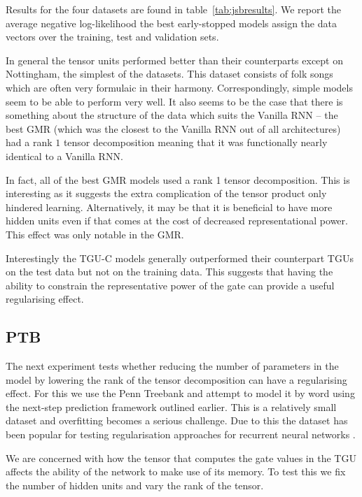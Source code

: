 Results for the four datasets are found in table~\ref{tab:jsbresults}. We report the average
negative log-likelihood the best early-stopped models assign the data vectors over
the training, test and validation sets.

In general the tensor units performed better than their counterparts except on
Nottingham, the simplest of the datasets. This dataset consists of folk songs which
are often very formulaic in their harmony. Correspondingly, simple models seem to be able to
perform very well. It also seems to be the case that there is something about the structure
of the data which suits the Vanilla RNN -- the best GMR (which was the closest to the
Vanilla RNN out of all architectures) had a rank \(1\) tensor decomposition meaning
that it was functionally nearly identical to a Vanilla RNN.

In fact, all of the best GMR models used a rank 1 tensor decomposition. This is interesting
as it suggests the extra complication of the tensor product only hindered learning.
Alternatively, it may be that it is beneficial to have more
hidden units even if that comes at the cost of decreased representational power. This effect
was only notable in the GMR. 

Interestingly the TGU-C models generally outperformed their counterpart TGUs on the test data but
not on the training data. This suggests that having the ability to constrain the representative
power of the gate can provide a useful regularising effect.

\subsection{PTB}
The next experiment tests whether reducing the number of parameters in the model by lowering
the rank of the tensor decomposition can have a regularising effect. For this we use the
Penn Treebank \autocite{Marcus1993} and attempt to model it by word using the next-step prediction
framework outlined earlier. This is a relatively small dataset and overfitting becomes a serious
challenge. Due to this the dataset has been popular for testing regularisation approaches for
recurrent neural networks \autocite{Zaremba2014, Gal2015}.

We are concerned with how the tensor that computes the gate values in the TGU affects the ability of
the network to make use of its memory. To test this we fix the number of hidden units and vary the
rank of the tensor.


